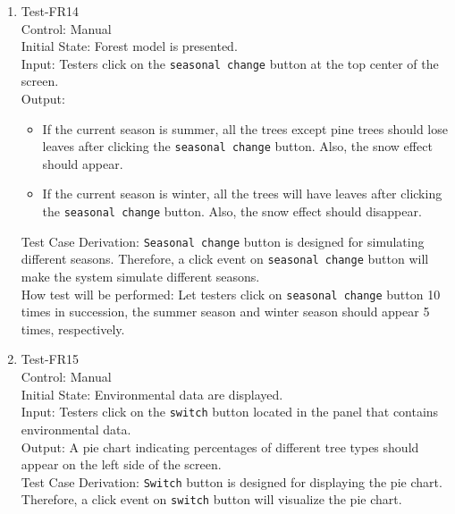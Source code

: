 \documentclass[12pt, titlepage]{article}
\begin{document}
\begin{enumerate}
\item{Test-FR14\\}
Control: Manual\\ 

Initial State: Forest model is presented.\\

Input: Testers click on the \verb|seasonal change| button at the top 
center of the screen.\\

Output: 
\begin{itemize}
\item If the current season is summer, all the trees except pine trees
should lose leaves after clicking the \verb|seasonal change| button.
Also, the snow effect should appear.
\item If the current season is winter, all the trees will have leaves 
after clicking the \verb|seasonal change| button. Also, the snow 
effect should disappear.
\end{itemize}

Test Case Derivation: \verb|Seasonal change| button is designed for 
simulating different seasons. Therefore, 
a click event on \verb|seasonal change| button will make the system 
simulate different seasons.\\
					
How test will be performed: Let testers click on \verb|seasonal change|
button 10 times in succession, the summer season and winter season 
should appear 5 times, respectively.

\item{Test-FR15\\}
Control: Manual\\ 

Initial State: Environmental data are displayed.\\

Input: Testers click on the \verb|switch| button located in the 
panel that contains environmental data.\\

Output: A pie chart indicating percentages of different tree 
types should appear on the left side of the screen.\\

Test Case Derivation: \verb|Switch| button is designed for 
displaying the pie chart. Therefore,  a click event on \verb|switch| 
button will visualize the pie chart.\\
					

\end{enumerate}
\end{document}
